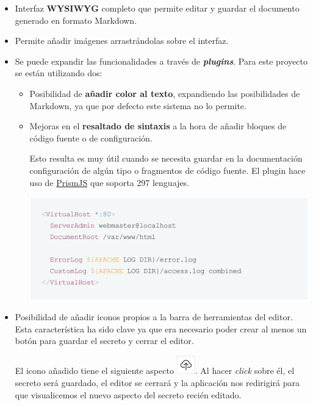 \documentclass{\ClassPath/viu-tfm-template}
\begin{document}
\begin{itemize}
    \item Interfaz \textbf{WYSIWYG} completo que permite editar y guardar el documento generado en formato Markdown.
    \item Permite añadir imágenes arrastrándolas sobre el interfaz.
    \item Se puede expandir las funcionalidades a través de \textit{\textbf{plugins}}. Para este proyecto se están utilizando dos:
    \begin{itemize}
        \item Posibilidad de \textbf{añadir color al texto}, expandiendo las posibilidades de Markdown, ya que por defecto este sistema no lo permite.
        \item Mejoras en el \textbf{resaltado de sintaxis} a la hora de añadir bloques de código fuente o de configuración.

        Esto resulta es muy útil cuando se necesita guardar en la documentación configuración de algún tipo o fragmentos de código fuente. El plugin hace uso de \href{https://prismjs.com/}{PrismJS} que soporta 297 lenguajes.
        \begin{center}
            \includegraphics[frame,width=0.7\linewidth]{img/editor_example.png}
        \end{center}
    \end{itemize}

    \item Posibilidad de añadir iconos propios a la barra de herramientas del editor. Esta característica ha sido clave ya que era necesario poder crear al menos un botón para guardar el secreto y cerrar el editor.

    El icono añadido tiene el siguiente aspecto \includegraphics[width=0.8cm]{img/save_exit.png}. Al hacer \textit{click} sobre él, el secreto será guardado, el editor se cerrará y la aplicación nos redirigirá para que visualicemos el nuevo aspecto del secreto recién editado.
\end{itemize}
\end{document}
